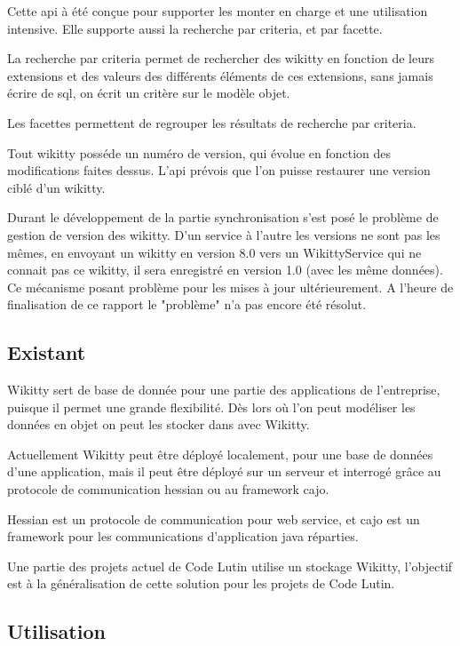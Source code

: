 Cette api à été conçue pour supporter les monter en charge et une utilisation
intensive. Elle supporte aussi la recherche par criteria, et par facette.

La recherche par criteria permet de rechercher des wikitty en fonction de leurs
extensions et des valeurs des différents éléments de ces extensions, sans jamais
écrire de sql, on écrit un critère sur le modèle objet. 

Les facettes permettent de regrouper les résultats de recherche par criteria. 

Tout wikitty posséde un numéro de version, qui évolue en fonction des
modifications faites dessus. L'api prévois que l'on puisse restaurer une version
ciblé d'un wikitty.

Durant le développement de la partie synchronisation s'est posé le problème de 
gestion de version des wikitty. D'un service à l'autre les versions ne 
sont pas les mêmes, en envoyant un wikitty en version 8.0 vers un WikittyService
qui ne connait pas ce wikitty, il sera enregistré en version 1.0 (avec les
même données). Ce mécanisme posant problème pour les mises à jour ultérieurement. 
A l'heure de finalisation de ce rapport le "problème" n'a pas encore été résolut.

\subsection{Existant}

Wikitty sert de base de donnée pour une partie des applications de l'entreprise,
puisque il permet une grande flexibilité. Dès lors où l'on peut modéliser les
données en objet on peut les stocker dans avec Wikitty.

Actuellement Wikitty peut être déployé localement, pour une base de données
d'une application, mais il peut être déployé sur un serveur et interrogé grâce
au protocole de communication hessian ou au framework cajo.

Hessian est un protocole de communication pour web service, et cajo est un
framework pour les communications d'application java réparties. 

Une partie des projets actuel de Code Lutin utilise un stockage Wikitty, 
l'objectif est à la généralisation de cette solution pour les projets de 
Code Lutin.

\subsection{Utilisation}

